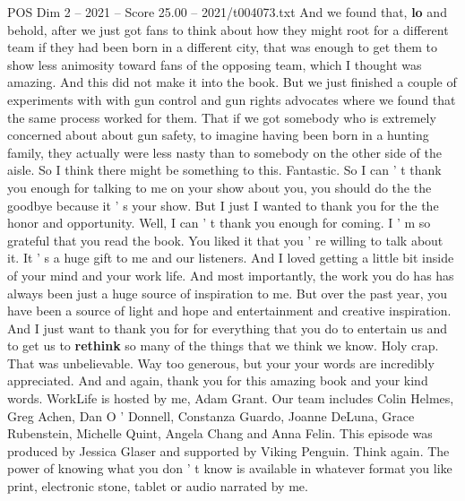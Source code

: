 \begin{textsample}{POS Dim 2 – 2021 – Score 25.00 – 2021/t004073.txt}
And we found that, \textbf{lo} and behold, after we just got fans to think about how they might root for a different team if they had been born in a different city, that was enough to get them to show less animosity toward fans of the opposing team, which I thought was amazing.
And this did not make it into the book.
But we just finished a couple of experiments with with gun control and gun rights advocates where we found that the same process worked for them.
That if we got somebody who is extremely concerned about about gun safety, to imagine having been born in a hunting family, they actually were less nasty than to somebody on the other side of the aisle.
So I think there might be something to this.
Fantastic.
So I can ' t thank you enough for talking to me on your show about you, you should do the the goodbye because it ' s your show.
But I just I wanted to thank you for the the honor and opportunity.
Well, I can ' t thank you enough for coming.
I ' m so grateful that you read the book.
You liked it that you ' re willing to talk about it.
It ' s a huge gift to me and our listeners.
And I loved getting a little bit inside of your mind and your work life.
And most importantly, the work you do has has always been just a huge source of inspiration to me.
But over the past year, you have been a source of light and hope and entertainment and creative inspiration.
And I just want to thank you for for everything that you do to entertain us and to get us to \textbf{rethink} so many of the things that we think we know.
Holy crap.
That was unbelievable.
Way too generous, but your your words are incredibly appreciated.
And and again, thank you for this amazing book and your kind words.
WorkLife is hosted by me, Adam Grant.
Our team includes Colin Helmes, Greg Achen, Dan O ' Donnell, Constanza Guardo, Joanne DeLuna, Grace Rubenstein, Michelle Quint, Angela Chang and Anna Felin.
This episode was produced by Jessica Glaser and supported by Viking Penguin.
Think again.
The power of knowing what you don ' t know is available in whatever format you like print, electronic stone, tablet or audio narrated by me.

\end{textsample}
